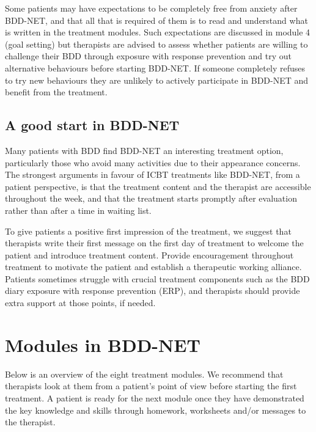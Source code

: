 \documentclass[]{book}
\theoremstyle{definition}
\theoremstyle{definition}
\theoremstyle{definition}
\theoremstyle{remark}
\begin{document}
Some patients may have expectations to be completely free from anxiety
after BDD-NET, and that all that is required of them is to read and
understand what is written in the treatment modules. Such expectations
are discussed in module 4 (goal setting) but therapists are advised to
assess whether patients are willing to challenge their BDD through
exposure with response prevention and try out alternative behaviours
before starting BDD-NET. If someone completely refuses to try new
behaviours they are unlikely to actively participate in BDD-NET and
benefit from the treatment.

\hypertarget{a-good-start-in-bdd-net}{%
\subsection{A good start in BDD-NET}\label{a-good-start-in-bdd-net}}

Many patients with BDD find BDD-NET an interesting treatment option,
particularly those who avoid many activities due to their appearance
concerns. The strongest arguments in favour of ICBT treatments like
BDD-NET, from a patient perspective, is that the treatment content and
the therapist are accessible throughout the week, and that the treatment
starts promptly after evaluation rather than after a time in waiting
list.

To give patients a positive first impression of the treatment, we
suggest that therapists write their first message on the first day of
treatment to welcome the patient and introduce treatment content.
Provide encouragement throughout treatment to motivate the patient and
establish a therapeutic working alliance. Patients sometimes struggle
with crucial treatment components such as the BDD diary exposure with
response prevention (ERP), and therapists should provide extra support
at those points, if needed.

\hypertarget{modules-in-bdd-net}{%
\section{Modules in BDD-NET}\label{modules-in-bdd-net}}

Below is an overview of the eight treatment modules. We recommend that
therapists look at them from a patient's point of view before starting
the first treatment. A patient is ready for the next module once they
have demonstrated the key knowledge and skills through homework,
worksheets and/or messages to the therapist.
\end{document}

